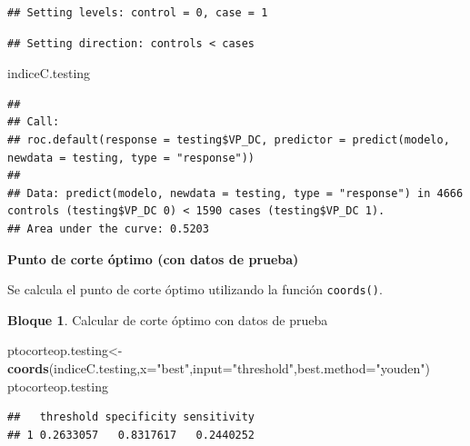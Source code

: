 \documentclass[]{book}
\newenvironment{Shaded}{\begin{snugshade}}{\end{snugshade}}
\newcommand{\DataTypeTok}[1]{\textcolor[rgb]{0.13,0.29,0.53}{#1}}
\newcommand{\KeywordTok}[1]{\textcolor[rgb]{0.13,0.29,0.53}{\textbf{#1}}}
\newcommand{\NormalTok}[1]{#1}
\newcommand{\OperatorTok}[1]{\textcolor[rgb]{0.81,0.36,0.00}{\textbf{#1}}}
\newcommand{\StringTok}[1]{\textcolor[rgb]{0.31,0.60,0.02}{#1}}
\theoremstyle{definition}
\theoremstyle{definition}
\newtheorem{example}{Bloque}[chapter]
\theoremstyle{definition}
\theoremstyle{definition}
\theoremstyle{remark}
\begin{document}
\begin{verbatim}
## Setting levels: control = 0, case = 1
\end{verbatim}

\begin{verbatim}
## Setting direction: controls < cases
\end{verbatim}

\begin{Shaded}
\begin{Highlighting}[]
\NormalTok{indiceC.testing}
\end{Highlighting}
\end{Shaded}

\begin{verbatim}
## 
## Call:
## roc.default(response = testing$VP_DC, predictor = predict(modelo,     newdata = testing, type = "response"))
## 
## Data: predict(modelo, newdata = testing, type = "response") in 4666 controls (testing$VP_DC 0) < 1590 cases (testing$VP_DC 1).
## Area under the curve: 0.5203
\end{verbatim}

\textbf{Punto de corte óptimo (con datos de prueba)}

Se calcula el punto de corte óptimo utilizando la función \texttt{coords()}.

\begin{example}
\protect\hypertarget{exm:bloque22nbm}{}{\label{exm:bloque22nbm} }Calcular de corte óptimo con datos de prueba
\end{example}

\begin{Shaded}
\begin{Highlighting}[]
\NormalTok{ptocorteop.testing<-}\KeywordTok{coords}\NormalTok{(indiceC.testing,}\DataTypeTok{x=}\StringTok{"best"}\NormalTok{,}\DataTypeTok{input=}\StringTok{"threshold"}\NormalTok{,}\DataTypeTok{best.method=}\StringTok{"youden"}\NormalTok{)}
\NormalTok{ptocorteop.testing}
\end{Highlighting}
\end{Shaded}

\begin{verbatim}
##   threshold specificity sensitivity
## 1 0.2633057   0.8317617   0.2440252
\end{verbatim}

\begin{Shaded}
\end{Shaded}
\end{document}
